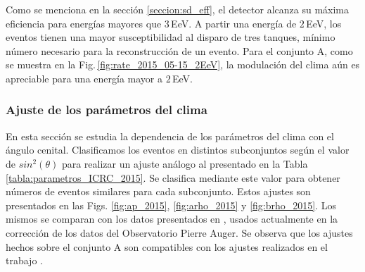 Como se menciona en la sección \ref{seccion:sd_eff}, el detector alcanza su máxima eficiencia para energías mayores que 3\,EeV. A partir una energía de $2\,$EeV, los eventos tienen una mayor susceptibilidad al disparo de tres tanques, mínimo número necesario para la reconstrucción de un evento. Para el conjunto A, como se muestra en la Fig.\,\ref{fig:rate_2015_05-15_2EeV}, la modulación del clima aún es apreciable para una energía mayor a $2\,$EeV. 
        \subsubsection{Ajuste de los parámetros del clima}
        En esta sección se estudia la dependencia de los parámetros del clima con el ángulo cenital. Clasificamos los eventos en distintos subconjuntos según el valor de $sin^2(\theta)$ para realizar un ajuste análogo al presentado en la Tabla \ref{tabla:parametros_ICRC_2015}. Se clasifica mediante este valor para obtener números de eventos similares para cada subconjunto. Estos ajustes son presentados en las Figs. \ref{fig:ap_2015}, \ref{fig:arho_2015} y \ref{fig:brho_2015}. Los mismos se comparan con los datos presentados en \cite{aab2017impact}, usados actualmente en la corrección de los datos del Observatorio Pierre Auger. Se observa que los ajustes hechos sobre el conjunto A son compatibles con los ajustes realizados en  el trabajo \cite{aab2017impact}. 
